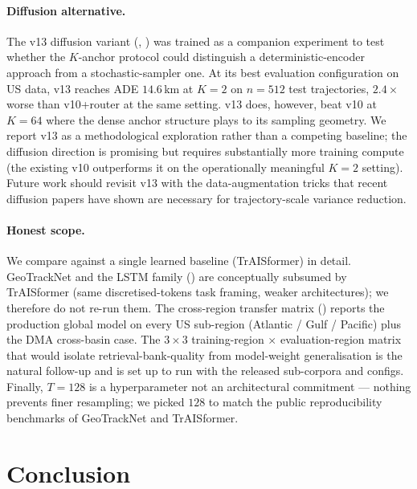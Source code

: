 \documentclass[11pt]{article}
\begin{document}
\paragraph{Diffusion alternative.} The v13 diffusion variant
(, ) was trained as a
companion experiment to test whether the $K$-anchor protocol could
distinguish a deterministic-encoder approach from a stochastic-sampler
one. At its best evaluation configuration on US data, v13 reaches
ADE $14.6$\,km at $K{=}2$ on $n{=}512$ test trajectories, $2.4 \times$
worse than v10+router at the same setting. v13 does, however, beat v10
at $K{=}64$ where the dense anchor structure plays to its sampling
geometry. We report v13 as a methodological exploration rather than a
competing baseline; the diffusion direction is promising but requires
substantially more training compute (the existing v10 outperforms it on
the operationally meaningful $K{=}2$ setting). Future work should
revisit v13 with the data-augmentation tricks that recent diffusion
papers have shown are necessary for trajectory-scale variance reduction.

\paragraph{Honest scope.} We compare against a single learned baseline
(TrAISformer) in detail. GeoTrackNet and the LSTM family
() are conceptually subsumed by TrAISformer (same
discretised-tokens task framing, weaker architectures); we therefore
do not re-run them. The cross-region transfer matrix
() reports the production global model on every
US sub-region (Atlantic / Gulf / Pacific) plus the DMA cross-basin
case. The $3 \times 3$ training-region $\times$ evaluation-region
matrix that would isolate retrieval-bank-quality from model-weight
generalisation is the natural follow-up and is set up to run with the
released sub-corpora and configs. Finally, $T{=}128$ is a hyperparameter
not an architectural commitment --- nothing prevents finer resampling;
we picked $128$ to match the public reproducibility benchmarks of
GeoTrackNet and TrAISformer.

\section{Conclusion}
\label{sec:conclusion}
\end{document}
